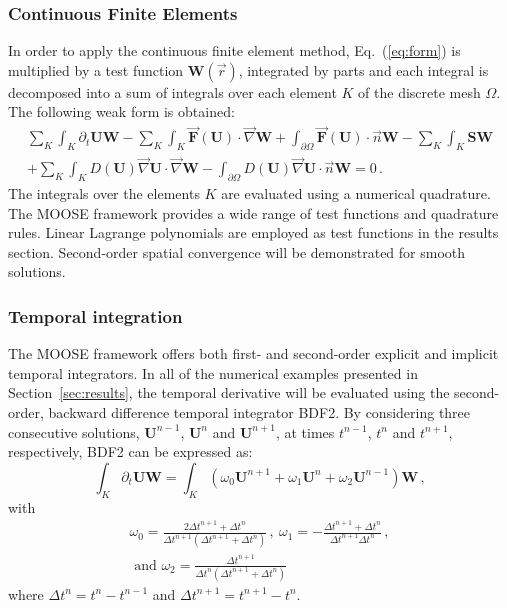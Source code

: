 \documentclass[preprint,10pt]{elsarticle}
\newcommand{\grad}{\vec{\nabla}}
\newcommand{\eqt}[1]{Eq.~(\ref{#1})}                     %
\newcommand{\sct}[1]{Section~\ref{#1}}                   %
\begin{document}
\subsubsection{Continuous Finite Elements} 
In order to apply the continuous finite element method, \eqt{eq:form} is multiplied by a test function 
$\mathbf W(\vec{r})$, integrated by parts and each integral is decomposed into a sum of integrals over 
each element $K$ of the discrete mesh $\Omega$. The following weak form is obtained:
\begin{multline}\label{eq:cfem}
\sum_K \int_{K} \partial_t \mathbf U \mathbf W - \sum_K \int_{K} \vec{\mathbf F}(\mathbf U) \cdot \grad \mathbf W + \int_{\partial \Omega} \vec{\mathbf F}(\mathbf U) \cdot \vec{n} \mathbf W - \sum_K \int_{K} \mathbf S \mathbf W  \\
+ \sum_K \int_{K} D(\mathbf U) \grad \mathbf U \cdot \grad \mathbf W 
- \int_{\partial \Omega} D(\mathbf U) \grad \mathbf U \cdot \vec{n} \mathbf W = 0 \,.
\end{multline}
The integrals over the elements $K$ are evaluated using a numerical quadrature. The MOOSE framework 
provides a wide range of test functions and quadrature rules. Linear Lagrange polynomials are employed 
as test functions in the results section. Second-order spatial convergence will be demonstrated for smooth solutions. 

\subsubsection{Temporal integration} 
The MOOSE framework offers both first- and second-order explicit and implicit temporal integrators. 
In all of the numerical examples presented in \sct{sec:results}, the temporal derivative  will be 
evaluated using the second-order, backward difference temporal integrator BDF2. By considering three 
consecutive solutions, $\mathbf U^{n-1}$, $\mathbf U^n$ and $\mathbf U^{n+1}$, at times $t^{n-1}$, $t^n$ and $t^{n+1}$, respectively, BDF2 can be expressed as:
\begin{equation}
\label{eq:BDF2}
\int_{K} \partial_t \mathbf U \mathbf  W = \int_{K} \left( \omega_0 \mathbf U^{n+1}  + \omega_1 \mathbf U^n + \omega_2 \mathbf U^{n-1} \right) \mathbf W \,,
\end{equation}
%
with
\begin{multline}
\omega_0 =\frac{2\Delta t^{n+1}+\Delta t^n}{\Delta t^{n+1} \left( \Delta t^{n+1}+\Delta t^n \right)} \, , \ 
\omega_1 = -\frac{\Delta t^{n+1}+\Delta t^n}{\Delta t^{n+1} \Delta t^n}  \, , \\
\text{ and } \omega_2 = \frac{\Delta t^{n+1}}{\Delta t^n \left( \Delta t^{n+1} + \Delta t^n \right)} \nonumber
\end{multline}
where $\Delta t^{n} = t^n-t^{n-1}$ and $\Delta t^{n+1} = t^{n+1}-t^{n}$.
\end{document}
